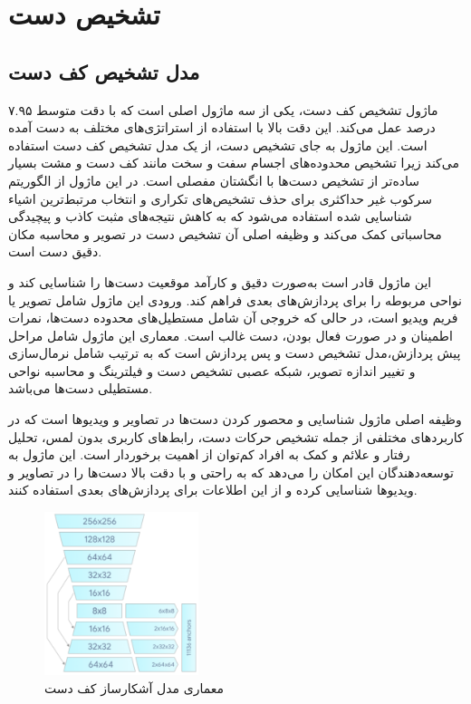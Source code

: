 


\section{تشخیص دست\protect{}}
\subsection{مدل تشخیص کف دست}
ماژول تشخیص کف دست، یکی از سه ماژول اصلی است که با دقت متوسط ۷.۹۵ درصد عمل می‌کند. این دقت بالا با استفاده از استراتژی‌های مختلف به دست آمده است. این ماژول به جای تشخیص دست، 
از یک مدل تشخیص کف دست استفاده می‌کند زیرا تشخیص محدوده‌های اجسام سفت و سخت مانند کف دست و مشت بسیار ساده‌تر از تشخیص دست‌ها با انگشتان مفصلی است. در این ماژول از
 الگوریتم سرکوب غیر حداکثری برای حذف تشخیص‌های تکراری و انتخاب مرتبط‌ترین اشیاء شناسایی شده استفاده می‌شود که به کاهش نتیجه‌های مثبت کاذب و پیچیدگی محاسباتی کمک می‌کند و وظیفه اصلی آن تشخیص دست در تصویر و محاسبه مکان دقیق دست است.

این ماژول قادر است به‌صورت دقیق و کارآمد موقعیت دست‌ها را شناسایی کند و نواحی مربوطه را برای
 پردازش‌های بعدی فراهم کند. ورودی این ماژول شامل تصویر یا فریم ویدیو است، در حالی که خروجی آن شامل مستطیل‌های محدوده دست‌ها، نمرات اطمینان و در صورت فعال بودن، دست غالب است. معماری این ماژول شامل 
 مراحل پیش پردازش،مدل تشخیص دست و پس پردازش است که به ترتیب شامل نرمال‌سازی و تغییر اندازه تصویر، شبکه عصبی تشخیص دست و فیلترینگ و محاسبه نواحی مستطیلی دست‌ها می‌باشد.

وظیفه اصلی ماژول شناسایی و محصور کردن دست‌ها در تصاویر و ویدیوها است که در کاربردهای مختلفی از جمله تشخیص حرکات دست، رابط‌های کاربری بدون لمس، تحلیل رفتار و علائم و کمک به افراد کم‌توان
 از اهمیت برخوردار است. این ماژول به توسعه‌دهندگان این امکان را می‌دهد که به راحتی و با دقت بالا دست‌ها را در تصاویر و ویدیوها شناسایی کرده و از این اطلاعات برای پردازش‌های بعدی استفاده کنند.


\begin{figure}[h]
    \centering
    \includegraphics[width=0.4\textwidth]{hand_detector.png}
    \caption[معماری مدل آشکارساز کف دست]{معماری مدل آشکارساز کف دست\cite{zhang2020mediapipe}}
\end{figure}

